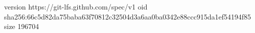 version https://git-lfs.github.com/spec/v1
oid sha256:66c5d82da75baba63f70812c32504d3a6aa0ba0342e88ccc915da1ef54194f85
size 196704
